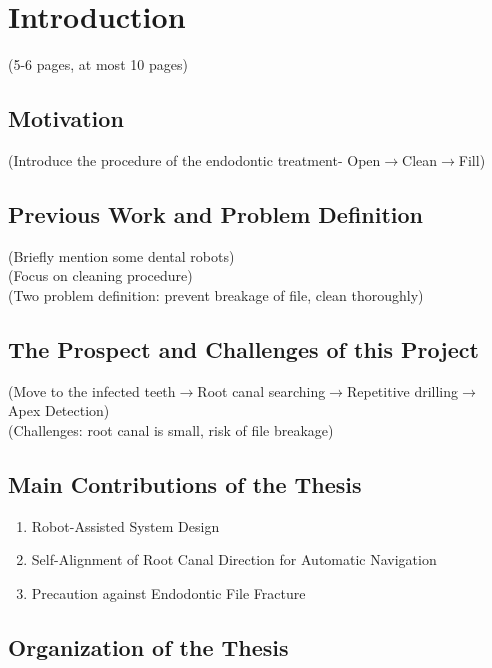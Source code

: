 \chapter{Introduction}
(5-6 pages, at most 10 pages)
\section{Motivation}
(Introduce the procedure of the endodontic treatment- Open$\longrightarrow $Clean$\longrightarrow $Fill)
\section{Previous Work and Problem Definition}
(Briefly mention some dental robots)																\\
(Focus on cleaning procedure)																		\\
(Two problem definition: prevent breakage of file, clean thoroughly)								
\section{The Prospect and Challenges of this Project}
(Move to the infected teeth$\longrightarrow $Root canal searching$\longrightarrow $Repetitive drilling$\longrightarrow $Apex Detection)		\\
(Challenges: root canal is small, risk of file breakage)											
\section{Main Contributions of the Thesis}
\begin{enumerate}
	\item	Robot-Assisted System Design
	\item	Self-Alignment of Root Canal Direction for Automatic Navigation
	\item	Precaution against Endodontic File Fracture
\end{enumerate}

\section{Organization of the Thesis}